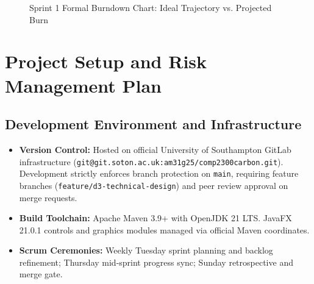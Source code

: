 \documentclass[12pt,a4paper]{article}
\newcommand{\code}[1]{\texttt{#1}}
\begin{document}
\begin{figure}[ht]
\centering
{}
\caption{Sprint 1 Formal Burndown Chart: Ideal Trajectory vs. Projected Burn}
\label{fig:burndown}
\end{figure}

\section{Project Setup and Risk Management Plan}

\subsection{Development Environment and Infrastructure}
\begin{itemize}[leftmargin=*]
  \item \textbf{Version Control:} Hosted on official University of Southampton GitLab infrastructure (\code{git@git.soton.ac.uk:am31g25/comp2300carbon.git}). Development strictly enforces branch protection on \code{main}, requiring feature branches (\code{feature/d3-technical-design}) and peer review approval on merge requests.
  \item \textbf{Build Toolchain:} Apache Maven 3.9+ with OpenJDK 21 LTS. JavaFX 21.0.1 controls and graphics modules managed via official Maven coordinates.
  \item \textbf{Scrum Ceremonies:} Weekly Tuesday sprint planning and backlog refinement; Thursday mid-sprint progress sync; Sunday retrospective and merge gate.
\end{itemize}
\end{document}
